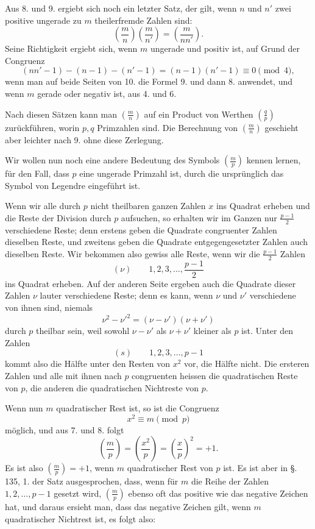 \documentclass[11pt]{article}
\begin{document}
Aus 8. und 9. ergiebt sich noch ein letzter Satz, der gilt, wenn $n$ und $n'$ zwei positive ungerade zu $m$ theilerfremde Zahlen sind:
\[
\tag{10'}
        \left(\frac mn\right)\left(\frac m{n'}\right)
        =
        \left(\frac m{nn'}\right).
\]
Seine Richtigkeit ergiebt sich, wenn $m$ ungerade und positiv ist, auf Grund der Congruenz
\[
\tag{7'}
 (nn'-1)-(n-1)-(n'-1)
 = (n-1)(n'-1)\equiv0\pmod 4,
\]
wenn man auf beide Seiten von 10. die Formel 9. und dann 8. anwendet, und wenn $m$ gerade oder negativ ist, aus 4. und 6.

Nach diesen Sätzen kann man $\left(\frac mn\right)$ auf ein Product von Werthen $\left(\frac qp\right)$ zurückführen, worin $p,q$ Primzahlen sind. Die Berechnung von $\left(\frac mn\right)$ geschieht aber leichter nach 9. ohne diese Zerlegung.

Wir wollen nun noch eine andere Bedeutung des Symbols $\left(\frac mp\right)$ kennen lernen, für den Fall, dass $p$ eine ungerade Primzahl ist, durch die ursprünglich das Symbol von Legendre eingeführt ist.

Wenn wir alle durch $p$ nicht theilbaren ganzen Zahlen $x$ ins Quadrat erheben und die Reste der Division durch $p$ aufsuchen, so erhalten wir im Ganzen nur $\frac{p-1}{2}$ verschiedene Reste; denn erstens geben die Quadrate congruenter Zahlen dieselben Reste, und zweitens geben die Quadrate entgegengesetzter Zahlen auch dieselben Reste. Wir bekommen also gewiss alle Reste, wenn wir die $\frac{p-1}{2}$ Zahlen
\[
(\nu)\qquad 1,2,3,\ldots,\frac{p-1}{2}
\]
ins Quadrat erheben. Auf der anderen Seite ergeben auch die Quadrate dieser Zahlen $\nu$ lauter verschiedene Reste; denn es kann, wenn $\nu$ und $\nu'$ verschiedene von ihnen sind, niemals
\[
        \nu^2-\nu'^2=(\nu-\nu')(\nu+\nu')
\]
durch $p$ theilbar sein, weil sowohl $\nu-\nu'$ als $\nu+\nu'$ kleiner als $p$ ist. Unter den Zahlen
\[
(s)\qquad 1,2,3,\ldots,p-1
\]
kommt also die Hälfte unter den Resten von $x^2$ vor, die Hälfte nicht. Die ersteren Zahlen und alle mit ihnen nach $p$ congruenten heissen die quadratischen Reste von $p$, die anderen die quadratischen Nichtreste von $p$.

Wenn nun $m$ quadratischer Rest ist, so ist die Congruenz
\[
        x^2\equiv m\pmod p
\]
möglich, und aus 7. und 8. folgt
\[
        \left(\frac mp\right)
        =\left(\frac{x^2}p\right)
        =\left(\frac xp\right)^2=+1.
\]
Es ist also $\left(\frac mp\right)=+1$, wenn $m$ quadratischer Rest von $p$ ist. Es ist aber in §.\,135, 1. der Satz ausgesprochen, dass, wenn für $m$ die Reihe der Zahlen $1,2,\ldots,p-1$ gesetzt wird, $\left(\frac mp\right)$ ebenso oft das positive wie das negative Zeichen hat, und daraus ersieht man, dass das negative Zeichen gilt, wenn $m$ quadratischer Nichtrest ist, es folgt also:
\end{document}
